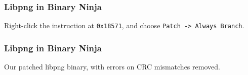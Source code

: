 \documentclass{beamer}
\begin{document}
\begin{frame}
\frametitle{Libpng in Binary Ninja}
  Right-click the instruction at \texttt{0x18571}, and choose
  \texttt{Patch -> Always Branch}.
\end{frame}

\begin{frame}
\frametitle{Libpng in Binary Ninja}
  \small{Our patched libpng binary, with errors on CRC mismatches removed.}
\end{frame}
\end{document}
